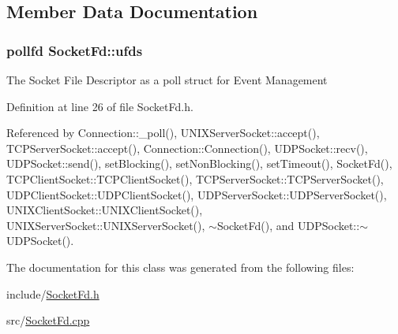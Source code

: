 \subsection{Member Data Documentation}
\hypertarget{classSocketFd_a0636825d276c3525e0d8af969ce2d3b6}{
\subsubsection[{ufds}]{\setlength{\rightskip}{0pt plus 5cm}pollfd Socket\+Fd\+::ufds\hspace{0.3cm}{\ttfamily [protected]}}}\label{classSocketFd_a0636825d276c3525e0d8af969ce2d3b6}
The Socket File Descriptor as a poll struct for Event Management 

Definition at line 26 of file Socket\+Fd.\+h.



Referenced by Connection\+::\+\_\+poll(), U\+N\+I\+X\+Server\+Socket\+::accept(), T\+C\+P\+Server\+Socket\+::accept(), Connection\+::\+Connection(), U\+D\+P\+Socket\+::recv(), U\+D\+P\+Socket\+::send(), set\+Blocking(), set\+Non\+Blocking(), set\+Timeout(), Socket\+Fd(), T\+C\+P\+Client\+Socket\+::\+T\+C\+P\+Client\+Socket(), T\+C\+P\+Server\+Socket\+::\+T\+C\+P\+Server\+Socket(), U\+D\+P\+Client\+Socket\+::\+U\+D\+P\+Client\+Socket(), U\+D\+P\+Server\+Socket\+::\+U\+D\+P\+Server\+Socket(), U\+N\+I\+X\+Client\+Socket\+::\+U\+N\+I\+X\+Client\+Socket(), U\+N\+I\+X\+Server\+Socket\+::\+U\+N\+I\+X\+Server\+Socket(), $\sim$\+Socket\+Fd(), and U\+D\+P\+Socket\+::$\sim$\+U\+D\+P\+Socket().



The documentation for this class was generated from the following files\+:\begin{DoxyCompactItemize}
\item 
include/\hyperlink{SocketFd_8h}{Socket\+Fd.\+h}\item 
src/\hyperlink{SocketFd_8cpp}{Socket\+Fd.\+cpp}\end{DoxyCompactItemize}
